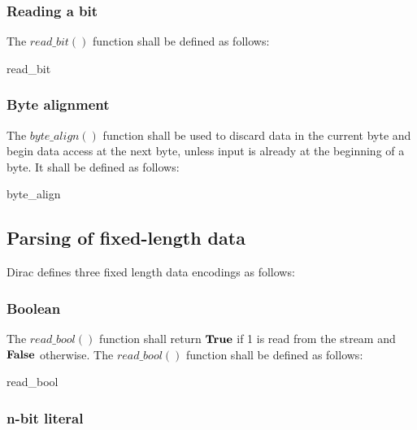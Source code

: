 \subsubsection{Reading a bit}\label{readbit}

The $read\_bit()$ function shall be defined as follows:

\begin{pseudo}{read\_bit}{}
\bsEND
{}
\end{pseudo}

\subsubsection{Byte alignment}\label{bytealign}

The $byte\_align()$ function shall be used to discard data in the current byte 
and begin data access at the next byte, unless input is already at the beginning
 of a byte. It shall be defined as follows: 

\begin{pseudo}{byte\_align}{}
\bsEND
\end{pseudo}

\subsection{Parsing of fixed-length data}

Dirac defines three fixed length data encodings as follows:

\subsubsection{Boolean}

The $read\_bool()$ function shall return $\text{\bf{True}}$ if 1 is read from the stream and 
$\text{\bf{False}}$ otherwise. The $read\_bool()$ function shall be defined as follows:

\begin{pseudo}{read\_bool}{}
    \bsRET{\true}
\bsELSE
    \bsRET{\false}
\bsEND
\end{pseudo}

\subsubsection{n-bit literal}\label{readnbits}

